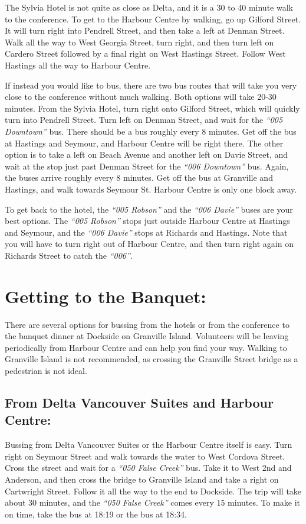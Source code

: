 \documentclass[letterpaper,12pt]{article}
\newcommand{\bus}[1]{\textit{``#1''}}
\begin{document}
The Sylvia Hotel is not quite as close as Delta, and it is a 30 to 40 minute walk to the conference. To get to the Harbour Centre by walking, go up Gilford Street. It will turn right into Pendrell Street, and then take a left at Denman Street. Walk all the way to West Georgia Street, turn right, and then turn left on Cardero Street followed by a final right on West Hastings Street. Follow West Hastings all the way to Harbour Centre.

If instead you would like to bus, there are two bus routes that will take you very close to the conference without much walking. Both options will take 20-30 minutes. From the Sylvia Hotel, turn right onto Gilford Street, which will quickly turn into Pendrell Street. Turn left on Denman Street, and wait for the \bus{005 Downtown} bus. There should be a bus roughly every 8 minutes. Get off the bus at Hastings and Seymour, and Harbour Centre will be right there. The other option is to take a left on Beach Avenue and another left on Davie Street, and wait at the stop just past Denman Street for the \bus{006 Downtown} bus. Again, the buses arrive roughly every 8 minutes. Get off the bus at Granville and Hastings, and walk towards Seymour St. Harbour Centre is only one block away.

To get back to the hotel, the \bus{005 Robson} and the \bus{006 Davie} buses are your best options. The \bus{005 Robson} stops just outside Harbour Centre at Hastings and Seymour, and the \bus{006 Davie} stops at Richards and Hastings. Note that you will have to turn right out of Harbour Centre, and then turn right again on Richards Street to catch the \bus{006}.


\section*{Getting to the Banquet:}

There are several options for bussing from the hotels or from the conference to the banquet dinner at Dockside on Granville Island. Volunteers will be leaving periodically from Harbour Centre and can help you find your way. Walking to Granville Island is not recommended, as crossing the Granville Street bridge as a pedestrian is not ideal.

\subsection*{From Delta Vancouver Suites and Harbour Centre:}

Bussing from Delta Vancouver Suites or the Harbour Centre itself is easy. Turn right on Seymour Street and walk towards the water to West Cordova Street. Cross the street and wait for a \bus{050 False Creek} bus. Take it to West 2nd and Anderson, and then cross the bridge to Granville Island and take a right on Cartwright Street. Follow it all the way to the end to Dockside. The trip will take about 30 minutes, and the \bus{050 False Creek} comes every 15 minutes. To make it on time, take the bus at 18:19 or the bus at 18:34.
\end{document}
